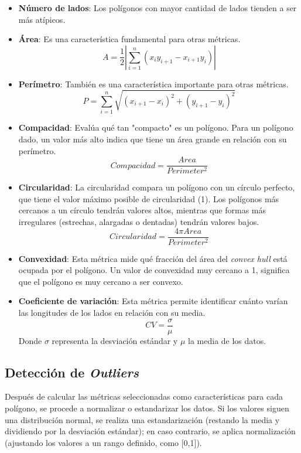 \documentclass[twocolumn, fontsize=10pt]{article}
\begin{document}
\begin{itemize}
    \item \textbf{Número de lados}: Los polígonos con mayor cantidad de lados tienden a ser más atípicos.
    \item \textbf{Área}: Es una característica fundamental para otras métricas.
    \[A = \frac{1}{2} \left| \sum_{i=1}^{n} \left( x_i y_{i+1} - x_{i+1} y_i \right) \right|\] \cite{area}
    \item \textbf{Perímetro}: También es una característica importante para otras métricas.
    \[P = \sum_{i=1}^{n} \sqrt{(x_{i+1} - x_i)^2 + (y_{i+1} - y_i)^2}\]
    \item \textbf{Compacidad}: Evalúa qué tan "compacto" es un polígono. Para un polígono dado, un valor más alto indica que tiene un área grande en relación con su perímetro.
    \[Compacidad = \frac{Area}{Perimeter^2} \]
    \item \textbf{Circularidad}: La circularidad compara un polígono con un círculo perfecto, que tiene el valor máximo posible de circularidad (1). Los polígonos más cercanos a un círculo tendrán valores altos, mientras que formas más irregulares (estrechas, alargadas o dentadas) tendrán valores bajos.
    \[Circularidad = \frac{4 \pi Area}{Perimeter^2}\]
    \item \textbf{Convexidad}: Esta métrica mide qué fracción del área del \textit{convex hull} está ocupada por el polígono. Un valor de convexidad muy cercano a 1, significa que el polígono es muy cercano a ser convexo.
    \item \textbf{Coeficiente de variación}: Esta métrica permite identificar cuánto varían las longitudes de los lados en relación con su media.
    \[CV = \frac{\sigma}{\mu}\]
    Donde \(\sigma\) representa la desviación estándar y  \(\mu\) la media de los datos.
\end{itemize}

\subsection{Detección de \textit{Outliers}}

Después de calcular las métricas seleccionadas como características para cada polígono, se procede a normalizar o estandarizar los datos. Si los valores siguen una distribución normal, se realiza una estandarización (restando la media y dividiendo por la desviación estándar); en caso contrario, se aplica normalización (ajustando los valores a un rango definido, como [0,1]).
\end{document}
